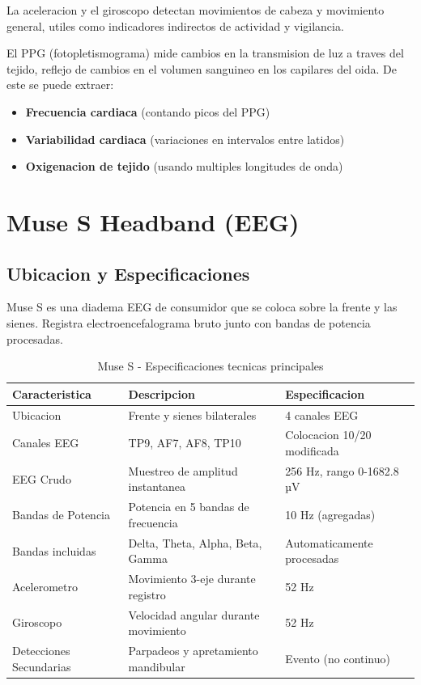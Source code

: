 La aceleracion y el giroscopo detectan movimientos de cabeza y movimiento general,
utiles como indicadores indirectos de actividad y vigilancia.

El PPG (fotopletismograma) mide cambios en la transmision de luz a traves del
tejido, reflejo de cambios en el volumen sanguineo en los capilares del oida.
De este se puede extraer:
\begin{itemize}
    \item \textbf{Frecuencia cardiaca} (contando picos del PPG)
    \item \textbf{Variabilidad cardiaca} (variaciones en intervalos entre latidos)
    \item \textbf{Oxigenacion de tejido} (usando multiples longitudes de onda)
\end{itemize}

\section{Muse S Headband (EEG)}

\subsection{Ubicacion y Especificaciones}

Muse S es una diadema EEG de consumidor que se coloca sobre la frente y las
sienes. Registra electroencefalograma bruto junto con bandas de potencia procesadas.

\begin{table}[H]
\centering
\caption{Muse S - Especificaciones tecnicas principales}
\begin{tabular}{|p{3.5cm}|p{4cm}|p{3cm}|}
\hline
\textbf{Caracteristica} & \textbf{Descripcion} & \textbf{Especificacion} \\
\hline
Ubicacion & Frente y sienes bilaterales & 4 canales EEG \\
\hline
Canales EEG & TP9, AF7, AF8, TP10 & Colocacion 10/20 modificada \\
\hline
EEG Crudo & Muestreo de amplitud instantanea & 256 Hz, rango 0-1682.8 µV \\
\hline
Bandas de Potencia & Potencia en 5 bandas de frecuencia & 10 Hz (agregadas) \\
\hline
Bandas incluidas & Delta, Theta, Alpha, Beta, Gamma & Automaticamente procesadas \\
\hline
Acelerometro & Movimiento 3-eje durante registro & 52 Hz \\
\hline
Giroscopo & Velocidad angular durante movimiento & 52 Hz \\
\hline
Detecciones Secundarias & Parpadeos y apretamiento mandibular & Evento (no continuo) \\
\hline
\end{tabular}
\end{table}

